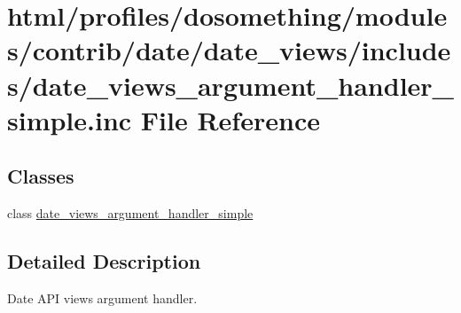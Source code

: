 \hypertarget{date__views__argument__handler__simple_8inc}{
\section{html/profiles/dosomething/modules/contrib/date/date\_\-views/includes/date\_\-views\_\-argument\_\-handler\_\-simple.inc File Reference}
\label{date__views__argument__handler__simple_8inc}
}
\subsection*{Classes}
\begin{DoxyCompactItemize}
\item 
class \hyperlink{classdate__views__argument__handler__simple}{date\_\-views\_\-argument\_\-handler\_\-simple}
\end{DoxyCompactItemize}


\subsection{Detailed Description}
Date API views argument handler. 